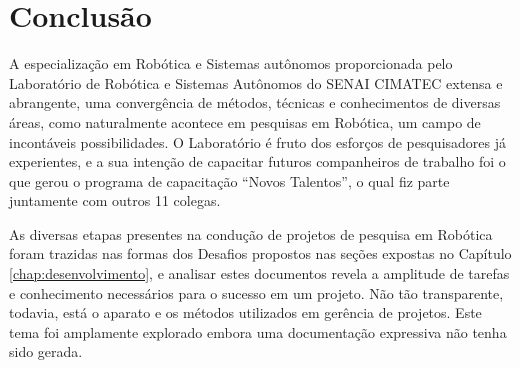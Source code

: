 \chapter{Conclusão}
\label{chap:conc}

A especialização em Robótica e Sistemas autônomos proporcionada pelo Laboratório de Robótica e Sistemas Autônomos do SENAI CIMATEC extensa e abrangente, uma convergência de métodos, técnicas e conhecimentos de diversas áreas, como naturalmente acontece em pesquisas em Robótica, um campo de incontáveis possibilidades. O Laboratório é fruto dos esforços de pesquisadores já experientes, e a sua intenção de capacitar futuros companheiros de trabalho foi o que gerou o programa de capacitação ``Novos Talentos'', o qual fiz parte juntamente com outros 11 colegas.

As diversas etapas presentes na condução de projetos de pesquisa em Robótica foram trazidas nas formas dos Desafios propostos nas seções expostas no Capítulo \ref{chap:desenvolvimento}, e analisar estes documentos revela a amplitude de tarefas e conhecimento necessários para o sucesso em um projeto. Não tão transparente, todavia, está o aparato e os métodos utilizados em gerência de projetos. Este tema foi amplamente explorado embora uma documentação expressiva não tenha sido gerada. 
